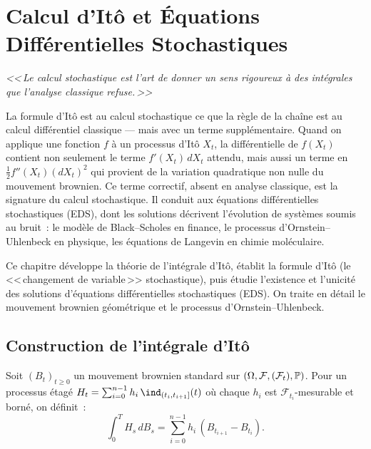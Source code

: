 \chapter{Calcul d'It\^o et \'Equations Diff\'erentielles Stochastiques}
\label{ch:ito_eds}

\begin{center}
\textit{<<\,Le calcul stochastique est l'art de donner un sens
rigoureux \`a des int\'egrales que l'analyse classique refuse.\,>>}
\end{center}

\bigskip

La formule d'It\^o est au calcul stochastique ce que la r\`egle de la cha\^ine est au calcul diff\'erentiel classique --- mais avec un terme suppl\'ementaire. Quand on applique une fonction $f$ \`a un processus d'It\^o $X_t$, la diff\'erentielle de $f(X_t)$ contient non seulement le terme $f'(X_t)\, dX_t$ attendu, mais aussi un terme en $\frac{1}{2} f''(X_t) (dX_t)^2$ qui provient de la variation quadratique non nulle du mouvement brownien. Ce terme correctif, absent en analyse classique, est la signature du calcul stochastique. Il conduit aux \'equations diff\'erentielles stochastiques (EDS), dont les solutions d\'ecrivent l'\'evolution de syst\`emes soumis au bruit~: le mod\`ele de Black--Scholes en finance, le processus d'Ornstein--Uhlenbeck en physique, les \'equations de Langevin en chimie mol\'eculaire.

Ce chapitre d\'eveloppe la th\'eorie de l'int\'egrale d'It\^o, \'etablit
la formule d'It\^o (le <<\,changement de variable\,>> stochastique),
puis \'etudie l'existence et l'unicit\'e des solutions d'\'equations
diff\'erentielles stochastiques (EDS). On traite en d\'etail le mouvement
brownien g\'eom\'etrique et le processus d'Ornstein--Uhlenbeck.

\section{Construction de l'int\'egrale d'It\^o}
\label{sec:integrale_ito}

\begin{definition}
Soit $(B_t)_{t \geq 0}$ un mouvement brownien standard sur
$(\Omega, \mathcal{F}, (\mathcal{F}_t), \mathbb{P})$. Pour un processus
\'etag\'e $H_t = \sum_{i=0}^{n-1} h_i\,\ind_{(t_i, t_{i+1}]}(t)$
o\`u chaque $h_i$ est $\mathcal{F}_{t_i}$-mesurable et born\'e,
on d\'efinit~:
\[
  \int_0^T H_s\, dB_s = \sum_{i=0}^{n-1} h_i\,(B_{t_{i+1}} - B_{t_i}).
\]
\end{definition}

